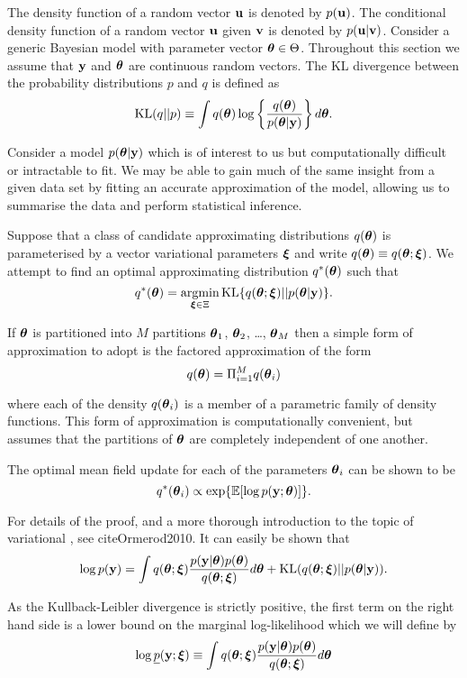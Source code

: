 The density function of a random vector ${\bf u}$ is denoted by $p({\bf u})$.  The conditional density function of a
random vector ${\bf u}$ given ${\bf v}$ is denoted by $p({\bf u}|{\bf v})$. Consider a generic Bayesian model with parameter
vector ${\boldsymbol \theta} \in \Theta$. Throughout this section we assume that ${\bf y}$ and ${\boldsymbol \theta}$ are continuous random
vectors. The KL divergence between the probability distributions $p$ and $q$ is defined as
$$
	\text{KL}(q || p) \equiv \int q({\boldsymbol \theta}) \log \left \{ \frac{q({\boldsymbol \theta})}{p({\boldsymbol \theta} | {\bf y})} \right \} d {\boldsymbol \theta}.
$$

Consider a model $p({\boldsymbol \theta}|{\bf y})$ which is of interest to us but computationally difficult or intractable to 
fit. We may be able to gain much of the same insight from a given data set by fitting an accurate approximation 
of the model, allowing us to summarise the data and perform statistical inference.

Suppose that a class of candidate approximating distributions $q({\boldsymbol \theta})$ is parameterised by a vector
variational parameters ${\boldsymbol \xi}$ and write $q({\boldsymbol \theta})\equiv q({\boldsymbol \theta};{\boldsymbol \xi})$. We attempt to find an  optimal
approximating distribution $q^*({\boldsymbol \theta})$ such that
$$
	\ds q^*(\vtheta) = \argmin_{\vxi \in \Xi} \text{KL} \{ {q(\vtheta;\vxi) || p(\vtheta|\vy)} \}.
$$

\noindent If ${\boldsymbol \theta}$ is partitioned into $M$ partitions ${\boldsymbol \theta}_1$, ${\boldsymbol \theta}_2$, \ldots, ${\boldsymbol \theta}_M$ then a 
simple form of approximation to adopt is the factored approximation of the form
$$
	q({\boldsymbol \theta}) = \Pi_{i=1}^M q({\boldsymbol \theta}_i)
$$

\noindent where each of the density $q({\boldsymbol \theta}_i)$ is a member of a parametric family of density functions.
This form of approximation is computationally convenient, but assumes that the partitions of ${\boldsymbol \theta}$ are
completely independent of one another.

The optimal mean field update for each of the parameters ${\boldsymbol \theta}_i$ can be shown to be
$$
	q^*({\boldsymbol \theta}_i) \propto \exp \{ \mathbb{E} [\log p({\bf y}; {\boldsymbol \theta})] \}.
$$

\noindent For details of the proof, and a more thorough introduction to the topic of variational
\approximations, see cite{Ormerod2010}. It can easily be shown that
$$
	\displaystyle \log p({\bf y}) = \int q({\boldsymbol \theta};{\boldsymbol \xi})\frac{p({\bf y}|{\boldsymbol \theta})p({\boldsymbol \theta})}{q({\boldsymbol \theta};{\boldsymbol \xi})} d{\boldsymbol \theta} + \text{KL}(q({\boldsymbol \theta};{\boldsymbol \xi})||p({\boldsymbol \theta}|{\bf y})).
$$

\noindent As the Kullback-Leibler divergence is strictly positive, the first term on the right hand side
is a lower bound on the marginal log-likelihood which we will define by
$$
\displaystyle \log \underline{p}({\bf y};{\boldsymbol \xi}) \equiv \int q({\boldsymbol \theta};{\boldsymbol \xi})\frac{p({\bf y}|{\boldsymbol \theta})p({\boldsymbol \theta})}{q({\boldsymbol \theta};{\boldsymbol \xi})} d{\boldsymbol \theta}
$$

